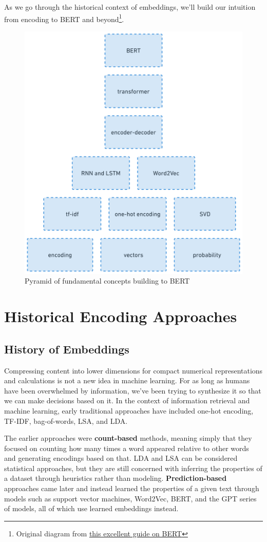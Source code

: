 \documentclass[11pt, table]{diazessay} %
\begin{document}
\begin{sloppypar}
As we go through the historical context of embeddings, we'll build our intuition from encoding to BERT and beyond\footnote{Original diagram from  \href{http://mccormickml.com/2019/11/11/bert-research-ep-1-key-concepts-and-sources/}{this excellent guide on BERT}}. 

\begin{figure}[H]
\centering
\includegraphics[width=.6\textwidth]{figures/pyramid.png}
\caption{Pyramid of fundamental concepts building to BERT}
\end{figure}

\section{Historical Encoding Approaches}
\subsection{History of Embeddings}

Compressing content into lower dimensions for compact numerical representations and calculations is not a new idea in machine learning. For as long as humans have been overwhelmed by information, we've been trying to synthesize it so that we can make decisions based on it. In the context of information retrieval and machine learning, early traditional approaches have included one-hot encoding, TF-IDF, bag-of-words, LSA, and LDA. 

The earlier approaches were \textbf{count-based} methods, meaning simply that they focused on counting how many times a word appeared relative to other words and generating encodings based on that. LDA and LSA can be considered statistical approaches, but they are still concerned with inferring the properties of a dataset through heuristics rather than modeling. \textbf{Prediction-based} approaches came later and instead learned the properties of a given text through models  such as support vector machines, Word2Vec, BERT, and the GPT series of models, all of which use learned embeddings instead. 


\end{sloppypar}
\end{document}
